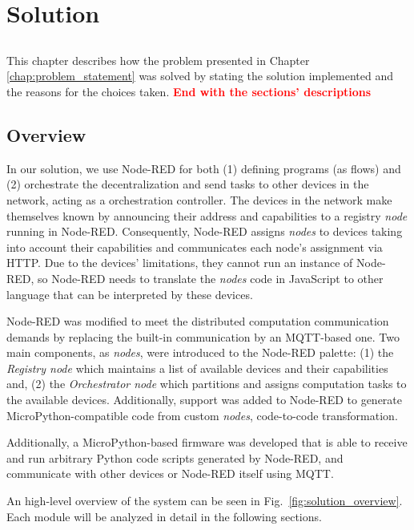 \chapter{Solution} \label{chap:solution} \minitoc

\section*{}

This chapter describes how the problem presented in Chapter \ref{chap:problem_statement} was solved by stating the solution implemented and the reasons for the choices taken.  \textbf{\textcolor{red}{End with the sections' descriptions}}

\section{Overview}\label{sec:solution_overview}

In our solution, we use Node-RED for both (1) defining programs (as flows) and (2) orchestrate the decentralization and send tasks to other devices in the network, acting as a orchestration controller. The devices in the network make themselves known by announcing their address and capabilities to a registry \textit{node} running in Node-RED. Consequently, Node-RED assigns \textit{nodes} to devices taking into account their capabilities and communicates each node's assignment via HTTP. Due to the devices' limitations, they cannot run an instance of Node-RED, so Node-RED needs to translate the \textit{nodes} code in JavaScript to other language that can be interpreted by these devices. 

Node-RED was modified to meet the distributed computation communication demands by replacing the built-in communication by an MQTT-based one. Two main components, as \textit{nodes}, were introduced to the Node-RED palette: (1) the \textit{Registry node} which maintains a list of available devices and their capabilities and, (2) the \textit{Orchestrator node} which partitions and assigns computation tasks to the available devices. Additionally, support was added to Node-RED to generate MicroPython-compatible code from custom \textit{nodes}, \ie code-to-code transformation.

Additionally, a MicroPython-based firmware was developed that is able to receive and run arbitrary Python code scripts generated by Node-RED, and communicate with other devices or Node-RED itself using MQTT. 

An high-level overview of the system can be seen in Fig.~\ref{fig:solution_overview}. Each module will be analyzed in detail in the following sections.

